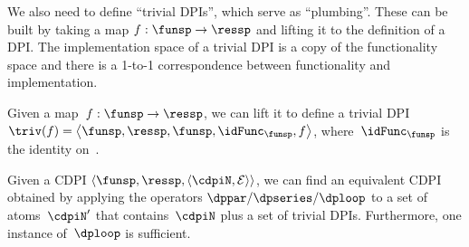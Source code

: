 We also need to define ``trivial DPIs'', which serve as ``plumbing''.
These can be built by taking a map $f:\funsp\rightarrow\ressp$ and
lifting it to the definition of a DPI. The implementation space of
a trivial DPI is a copy of the functionality space and there is a
1-to-1 correspondence between functionality and implementation.
\begin{definition}
  Given a map~$f:\funsp\rightarrow\ressp$, we can lift it to define
  a trivial DPI $\triv(f)=\left\langle \funsp,\ressp,\funsp,\idFunc_{\funsp},f\right\rangle $,
  where~$\idFunc_{\funsp}$ is the identity on~\funsp.
\end{definition}
\begin{proposition}
  \label{prop:reduction}Given a CDPI $\left\langle \funsp,\ressp,\left\langle \cdpiN,\mathcal{E}\right\rangle \right\rangle $,
  we can find an equivalent CDPI obtained by applying the operators
  $\dppar/\dpseries/\dploop$ to a set of atoms~$\cdpiN'$ that contains~$\cdpiN$
  plus a set of trivial DPIs. Furthermore, one instance of~$\dploop$
  is sufficient.
\end{proposition}
